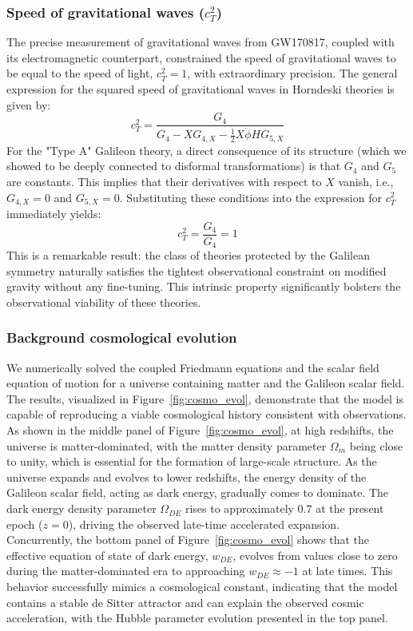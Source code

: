 \documentclass[twocolumn]{aastex631}
\begin{document}
\subsubsection{Speed of gravitational waves ($c_T^2$)}
The precise measurement of gravitational waves from GW170817, coupled with its electromagnetic counterpart, constrained the speed of gravitational waves to be equal to the speed of light, $c_T^2 = 1$, with extraordinary precision. The general expression for the squared speed of gravitational waves in Horndeski theories is given by:
\begin{equation}
    c_T^2 = \frac{G_4}{G_4 - X G_{4,X} - \frac{1}{2}X\dot{\phi}H G_{5,X}}
\end{equation}
For the "Type A" Galileon theory, a direct consequence of its structure (which we showed to be deeply connected to disformal transformations) is that $G_4$ and $G_5$ are constants. This implies that their derivatives with respect to $X$ vanish, i.e., $G_{4,X} = 0$ and $G_{5,X} = 0$. Substituting these conditions into the expression for $c_T^2$ immediately yields:
\begin{equation}
    c_T^2 = \frac{G_4}{G_4} = 1
\end{equation}
This is a remarkable result: the class of theories protected by the Galilean symmetry naturally satisfies the tightest observational constraint on modified gravity without any fine-tuning. This intrinsic property significantly bolsters the observational viability of these theories.

\subsubsection{Background cosmological evolution}
We numerically solved the coupled Friedmann equations and the scalar field equation of motion for a universe containing matter and the Galileon scalar field. The results, visualized in \mbox{Figure \ref{fig:cosmo_evol}}, demonstrate that the model is capable of reproducing a viable cosmological history consistent with observations. As shown in the middle panel of \mbox{Figure \ref{fig:cosmo_evol}}, at high redshifts, the universe is matter-dominated, with the matter density parameter $\Omega_m$ being close to unity, which is essential for the formation of large-scale structure. As the universe expands and evolves to lower redshifts, the energy density of the Galileon scalar field, acting as dark energy, gradually comes to dominate. The dark energy density parameter $\Omega_{DE}$ rises to approximately $0.7$ at the present epoch ($z=0$), driving the observed late-time accelerated expansion. Concurrently, the bottom panel of \mbox{Figure \ref{fig:cosmo_evol}} shows that the effective equation of state of dark energy, $w_{DE}$, evolves from values close to zero during the matter-dominated era to approaching $w_{DE} \approx -1$ at late times. This behavior successfully mimics a cosmological constant, indicating that the model contains a stable de Sitter attractor and can explain the observed cosmic acceleration, with the Hubble parameter evolution presented in the top panel.
\end{document}

